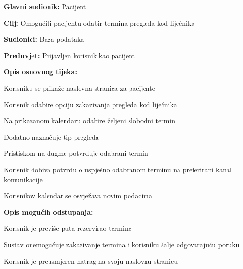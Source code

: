 					\noindent {}
					\begin{packed_item}
	
						\item \textbf{Glavni sudionik: }Pacijent
						\item  \textbf{Cilj:} Omogućiti pacijentu odabir termina pregleda kod liječnika
						\item  \textbf{Sudionici:} Baza podataka
						\item  \textbf{Preduvjet:} Prijavljen korisnik kao pacijent
						\item  \textbf{Opis osnovnog tijeka:}
						
						\item[] \begin{packed_enum}
	
							\item Korisniku se prikaže naslovna stranica za pacijente
							\item Korisnik odabire opciju zakazivanja pregleda kod liječnika 
							\item Na prikazanom kalendaru odabire željeni slobodni termin
							\item Dodatno naznačuje tip pregleda
							\item Pristiskom na dugme potvrđuje odabrani termin
							\item Korisnik dobiva potvrdu o uspješno odabranom terminu na preferirani kanal komunikacije
							\item Korisnikov kalendar se osvježava novim podacima
						\end{packed_enum}
						
						\item  \textbf{Opis mogućih odstupanja:}
						
						\item[] \begin{packed_item}
	
							\item[2.a] Korisnik je previše puta rezervirao termine
							\item[] \begin{packed_enum}
								
								\item Sustav onemogućuje zakazivanje termina i korisniku šalje odgovarajuću poruku
								\item Korisnik je preusmjeren natrag na svoju naslovnu stranicu
							\end{packed_enum}
							

\end{packed_item}
\end{packed_item}

